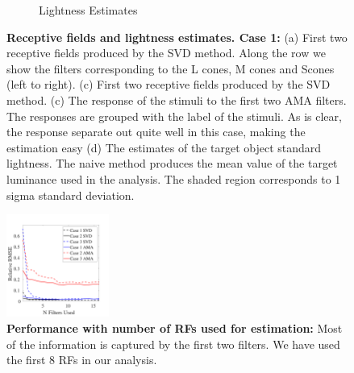\documentclass{jov}
\begin{document}
\begin{figure}
\begin{subfigure}[b]{0.20 \textwidth}
        \caption{Lightness Estimates}
        \label{fig:case9Results}
    \end{subfigure}    
    \caption{{\bf Receptive fields and lightness estimates. Case 1:} (a) First two receptive fields produced by the SVD method. Along the row we show the filters corresponding to the L cones, M cones and Scones (left to right). (c) First two receptive fields produced by the SVD method. (c) The response of the stimuli to the first two AMA filters. The responses are grouped with the label of the stimuli. As is clear, the response separate out quite well in this case, making the estimation easy (d) The estimates of the target object standard lightness. The naive method produces the mean value of the target luminance used in the analysis. The shaded region corresponds to 1 sigma standard deviation.}
\label{fig:case9AllResults}
\end{figure}

\begin{figure}
\centering
\includegraphics[width=0.3\textwidth]{../Figures/Figure5/Figure5.pdf}
\caption{{\bf Performance with number of RFs used for estimation:} Most of the information is captured by the first two filters. We have used the first 8 RFs in our analysis.}
\label{fig:RMSEvsNFilters}
\end{figure}
\end{document}
